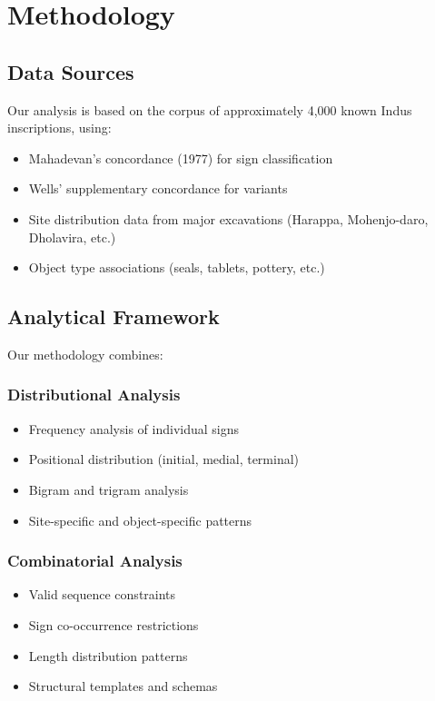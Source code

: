 \section{Methodology}

\subsection{Data Sources}

Our analysis is based on the corpus of approximately 4,000 known Indus inscriptions, using:

\begin{itemize}
    \item Mahadevan's concordance (1977) for sign classification
    \item Wells' supplementary concordance for variants
    \item Site distribution data from major excavations (Harappa, Mohenjo-daro, Dholavira, etc.)
    \item Object type associations (seals, tablets, pottery, etc.)
\end{itemize}

\subsection{Analytical Framework}

Our methodology combines:

\subsubsection{Distributional Analysis}
\begin{itemize}
    \item Frequency analysis of individual signs
    \item Positional distribution (initial, medial, terminal)
    \item Bigram and trigram analysis
    \item Site-specific and object-specific patterns
\end{itemize}

\subsubsection{Combinatorial Analysis}
\begin{itemize}
    \item Valid sequence constraints
    \item Sign co-occurrence restrictions
    \item Length distribution patterns
    \item Structural templates and schemas
\end{itemize}

